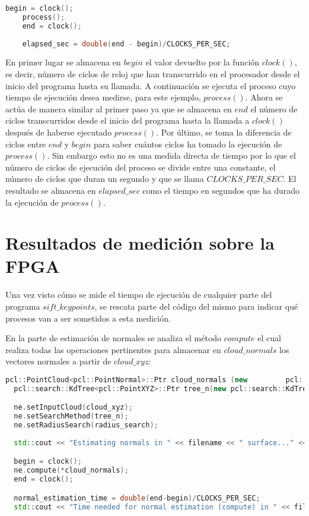 \begin{lstlisting}[language=C++,breaklines]
	begin = clock();
	process();
	end = clock();
	
	elapsed_sec = double(end - begin)/CLOCKS_PER_SEC;
\end{lstlisting}

En primer lugar se almacena en $begin$ el valor devuelto por la función $clock()$, es decir, número de ciclos de reloj que han transcurrido en el procesador desde el inicio del programa hasta su llamada. A continuación se ejecuta el proceso cuyo tiempo de ejecución desea medirse, para este ejemplo, $process()$. Ahora se actúa de manera similar al primer paso ya que se almacena en $end$ el número de ciclos transcurridos desde el inicio del programa hasta la llamada a $clock()$ después de haberse ejecutado $process()$. Por último, se toma la diferencia de ciclos entre $end$ y $begin$ para saber cuántos ciclos ha tomado la ejecución de $process()$. Sin embargo esto no es una medida directa de tiempo por lo que el número de ciclos de ejecución del proceso se divide entre una constante, el número de ciclos que duran un segundo y que se llama $CLOCKS\_PER\_SEC$. El resultado se almacena en $elapsed\_sec$ como el tiempo en segundos que ha durado la ejecución de $process()$.


\section{Resultados de medición sobre la FPGA}
Una vez visto cómo se mide el tiempo de ejecución de cualquier parte del programa $sift\_keypoints$, se rescata parte del código del mismo para indicar qué procesos van a ser sometidos a esta medición.


En la parte de estimación de normales se analiza el método $compute$ el cual realiza todas las operaciones pertinentes para almacenar en $cloud\_normals$ los vectores normales a partir de $cloud\_xyz$:


\begin{lstlisting}[language=C++,breaklines]
  pcl::PointCloud<pcl::PointNormal>::Ptr cloud_normals (new 		pcl::PointCloud<pcl::PointNormal>);
  pcl::search::KdTree<pcl::PointXYZ>::Ptr tree_n(new pcl::search::KdTree<pcl::PointXYZ>());

  ne.setInputCloud(cloud_xyz);
  ne.setSearchMethod(tree_n);
  ne.setRadiusSearch(radius_search);
 
  std::cout << "Estimating normals in " << filename << " surface..." <<std::endl;

  begin = clock();
  ne.compute(*cloud_normals);
  end = clock();

  normal_estimation_time = double(end-begin)/CLOCKS_PER_SEC;
  std::cout << "Time needed for normal estimation (compute) in " << filename << ": " << normal_estimation_time << " seconds" << std::endl << std::endl;
\end{lstlisting}

